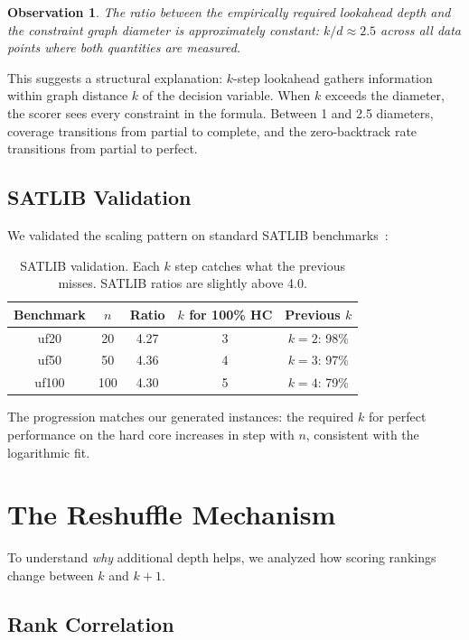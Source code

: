 \documentclass[11pt,a4paper]{article}
\newtheorem{observation}{Observation}
\begin{document}
\begin{observation}
The ratio between the empirically required lookahead depth and the constraint graph diameter is approximately constant: $k / d \approx 2.5$ across all data points where both quantities are measured.
\end{observation}

This suggests a structural explanation: $k$-step lookahead gathers information within graph distance $k$ of the decision variable. When $k$ exceeds the diameter, the scorer sees every constraint in the formula. Between 1 and 2.5 diameters, coverage transitions from partial to complete, and the zero-backtrack rate transitions from partial to perfect.

\subsection{SATLIB Validation}

We validated the scaling pattern on standard SATLIB benchmarks~\citep{satlib}:

\begin{table}[h]
\centering
\begin{tabular}{@{}ccccc@{}}
\toprule
Benchmark & $n$ & Ratio & $k$ for 100\% HC & Previous $k$ \\
\midrule
uf20  & 20  & 4.27 & 3 & $k{=}2$: 98\% \\
uf50  & 50  & 4.36 & 4 & $k{=}3$: 97\% \\
uf100 & 100 & 4.30 & 5 & $k{=}4$: 79\% \\
\bottomrule
\end{tabular}
\caption{SATLIB validation. Each $k$ step catches what the previous misses. SATLIB ratios are slightly above 4.0.}
\label{tab:satlib}
\end{table}

The progression matches our generated instances: the required $k$ for perfect performance on the hard core increases in step with $n$, consistent with the logarithmic fit.

\section{The Reshuffle Mechanism}\label{sec:reshuffle}

To understand \emph{why} additional depth helps, we analyzed how scoring rankings change between $k$ and $k+1$.

\subsection{Rank Correlation}
\end{document}
